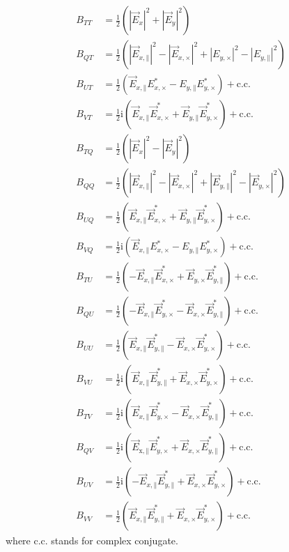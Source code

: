 \documentclass[a4paper,11pt]{article}
\newcommand{\co}{\mathbin{\|}}
\newcommand{\cx}{\mathbin{\times}}
\begin{document}
\begin{equation}
\begin{split}
B_{TT}&=\frac{1}{2}\left(\left|\vec{E}_{x}\right|^{2}+\left|\vec{E}_{y}\right|^{2}\right)\\
B_{QT}&=\frac{1}{2}\left(\left|\vec{E}_{x,\co}\right|^{2}-\left|\vec{E}_{x,\cx}\right|^{2} +  \left|E_{y,\cx}\right|^{2}-\left|E_{y,\co}\right|^{2}\right)\\
B_{UT}&=\frac{1}{2}\left(\vec{E}_{x,\co} E_{x,\cx}^{*} - E_{y,\co} E_{y,\cx}^{*}\right) + \mathrm{c.c.}\\
B_{VT}&=\frac{1}{2}\mathrm{i}\left(\vec{E}_{x,\co}\vec{E}_{x,\cx}^{*} + \vec{E}_{y,\co} \vec{E}_{y,\cx}^{*}\right) + \mathrm{c.c.}\\
B_{TQ}&=\frac{1}{2}\left(\left|\vec{E}_{x}\right|^{2}-\left|\vec{E}_{y}\right|^{2}\right)\\
B_{QQ}&=\frac{1}{2}\left(\left|\vec{E}_{x,\co}\right|^{2}-\left|\vec{E}_{x,\cx}\right|^{2}+\left|\vec{E}_{y,\co}\right|^{2}-\left|\vec{E}_{y,\cx}\right|^{2}\right)\\
B_{UQ}&=\frac{1}{2}\left(\vec{E}_{x,\co} \vec{E}_{x,\cx}^{*} + \vec{E}_{y,\co} \vec{E}_{y,\cx}^{*}\right)+\mathrm{c.c.}\\
B_{VQ}&=\frac{1}{2}\mathrm{i}\left( \vec{E}_{x,\co} E_{x,\cx}^{*} - E_{y,\co} E_{y,\cx}^{*}\right)+\mathrm{c.c.}\\
B_{TU}&=\frac{1}{2}\left( -\vec{E}_{x,\co} \vec{E}_{x,\cx}^{*} + \vec{E}_{y,\cx} \vec{E}_{y,\co}^{*}\right)+\mathrm{c.c.}\\
B_{QU}&=\frac{1}{2}\left(-\vec{E}_{x,\co}\vec{E}_{y,\cx}^{*} - \vec{E}_{x,\cx} \vec{E}_{y,\co}^{*}\right)+\mathrm{c.c.}\\
B_{UU}&=\frac{1}{2}\left(\vec{E}_{x,\co} \vec{E}_{y,\co}^{*} - \vec{E}_{x,\cx} \vec{E}_{y,\cx}^{*}\right)+\mathrm{c.c.}\\
B_{VU}&=\frac{1}{2}\mathrm{i}\left(\vec{E}_{x,\co} \vec{E}_{y,\co}^{*} + \vec{E}_{x,\cx}\vec{E}_{y,\cx}^{*}\right)+\mathrm{c.c.}\\
B_{TV}&=\frac{1}{2}\mathrm{i}\left(\vec{E}_{x,\co} \vec{E}_{y,\cx}^{*} - \vec{E}_{x,\cx}\vec{E}_{y,\co}^{*}\right)+\mathrm{c.c.}\\
B_{QV}&=\frac{1}{2}\mathrm{i}\left(\vec{E}_{\mathrm{x,\co}} \vec{E}_{y,\cx}^{*} + \vec{E}_{x,\cx} \vec{E}_{y,\co}^{*}\right)+\mathrm{c.c.}\\
B_{UV}&=\frac{1}{2}\mathrm{i}\left(-\vec{E}_{x,\co} \vec{E}_{y,\co}^{*} + \vec{E}_{x,\cx} \vec{E}_{y,\cx}^{*}\right)+\mathrm{c.c.}\\
B_{VV}&=\frac{1}{2}\left(\vec{E}_{x,\co} \vec{E}_{y,\co}^{*} + \vec{E}_{x,\cx} \vec{E}_{y,\cx}^{*}\right)+\mathrm{c.c.}
\end{split}
\end{equation}
%
\noindent
where c.c. stands for complex conjugate.
\end{document}
